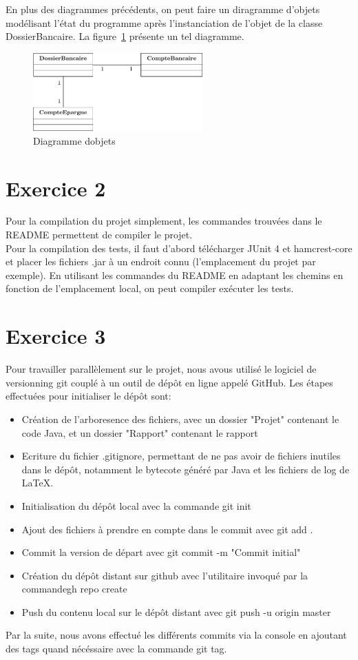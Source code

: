 \documentclass[12pt]{article}
\begin{document}
En plus des diagrammes précédents, on peut faire un diragramme d'objets modélisant l'état du programme après l'instanciation de l'objet de la classe DossierBancaire.
La figure~\ref{UO1} présente un tel diagramme. 
\begin{figure}[h]
    \centering
    \includegraphics[height=3cm]{Diagrammes/UML_UO1.pdf}
    \caption{Diagramme d\textquotesingle objets\label{UO1}}
\end{figure}

\section{Exercice 2}

Pour la compilation du projet simplement, les commandes trouvées 
dans le README permettent de compiler le projet.
\\
Pour la compilation des tests, il faut d'abord télécharger JUnit 4 et hamcrest-core et placer les fichiers .jar
à un endroit connu (l'emplacement du projet par exemple). En utilisant les commandes du README en adaptant les 
chemins en fonction de l'emplacement local, on peut compiler exécuter les tests.

\section{Exercice 3}

Pour travailler parallèlement sur le projet, nous avous utilisé le logiciel de versionning git couplé à un outil 
de dépôt en ligne appelé GitHub. Les étapes effectuées pour initialiser le dépôt sont:
\begin{itemize}
    \item Création de l'arboresence des fichiers, avec un dossier "Projet" contenant le code Java, et un dossier "Rapport" contenant le rapport
    \item Ecriture du fichier .gitignore, permettant de ne pas avoir de fichiers inutiles dans le dépôt, notamment le bytecote généré par Java et les fichiers de log de \LaTeX.
    \item Initialisation du dépôt local avec la commande \textquotesingle git init\textquotesingle
    \item Ajout des fichiers à prendre en compte dans le commit avec \textquotesingle git add .\textquotesingle 
    \item Commit la version de départ avec \textquotesingle git commit -m "Commit initial"\textquotesingle 
    \item Création du dépôt distant sur github avec l'utilitaire invoqué par la commande\textquotesingle gh repo create\textquotesingle 
    \item Push du contenu local sur le dépôt distant avec \textquotesingle git push -u origin master\textquotesingle 
\end{itemize}

Par la suite, nous avons effectué les différents commits via la console en ajoutant des tags quand 
nécéssaire avec la commande \textquotesingle git tag\textquotesingle .
\end{document}
